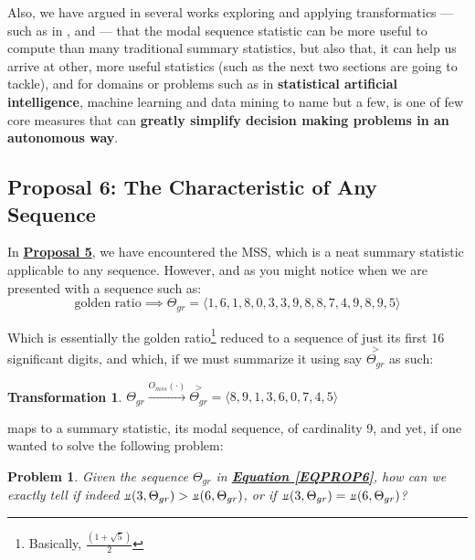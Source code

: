 \documentclass[12pt,a4paper]{article}
\newtheorem{trans}{Transformation}
\newtheorem{prob}{Problem}
\newcommand{\invpi}[1]{\mathop{\rotatebox[origin=c]{180}{$\pi$}}#1}
\begin{document}
Also, we have argued in several works exploring and applying transformatics --- such as in \cite{transformatics}, \cite{adtpaper} and \cite{lutalo_2025_trans_genetics} --- that the modal sequence statistic can be more useful to compute than many traditional summary statistics, but also that, it can help us arrive at other, more useful statistics (such as the next two sections are going to tackle), and for domains or problems such as in \textbf{statistical artificial intelligence}, machine learning and data mining to name but a few, is one of few core measures that can \textbf{greatly simplify decision making problems in an autonomous way}.


\subsection{Proposal 6: The Characteristic of Any Sequence\cite{lutalo_2025_trans_genetics}}
\label{PROP6}

In \textbf{\hyperref[PROP5]{Proposal 5}}, we have encountered the MSS, which is a neat summary statistic applicable to any sequence. However, and as you might notice when we are presented with a sequence such as:\\


\begin{equation}
\label{EQPROP6}
\text{golden ratio} \implies \Theta_{gr} = \langle 1, 6, 1, 8, 0, 3, 3, 9, 8, 8, 7, 4, 9, 8, 9, 5 \rangle 
\end{equation}

Which is essentially the golden ratio\footnote{Basically, $\frac{(1 + \sqrt{5})}{2}$} reduced to a sequence of just its first 16 significant digits, and which, if we must summarize it using say $\overset{>}{\Theta_{gr}}$ as such:\\


\begin{trans}
$ \Theta_{gr} \xrightarrow{O_{mss}(\cdot)} \overset{>}{\Theta_{gr}} = \langle 8, 9, 1, 3, 6, 0, 7, 4, 5 \rangle$
\end{trans}

maps to a summary statistic, its modal sequence, of cardinality 9, and yet, if one wanted to solve the following problem:

\begin{prob}
\label{PROBSC1}
Given the sequence $\Theta_{gr}$ in \textbf{\hyperref[EQPROP6]{Equation \ref{EQPROP6}}}, how can we exactly tell if indeed $\invpi(3,\Theta_{gr}) > \invpi(6,\Theta_{gr})$, or if $\invpi(3,\Theta_{gr}) = \invpi(6,\Theta_{gr})$?
\end{prob}
\end{document}
